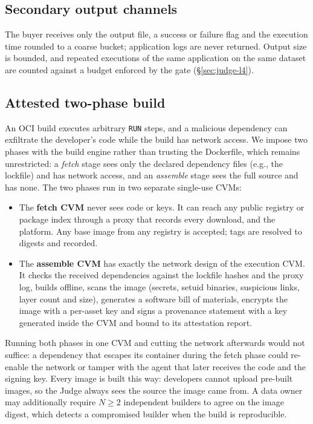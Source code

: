 \subsection{Secondary output channels}\label{sec:design-channels}
The buyer receives only the output file, a success or failure flag and the execution time
rounded to a coarse bucket; application logs are never returned. Output size is bounded, and
repeated executions of the same application on the same dataset are counted against a budget
enforced by the gate (\S\ref{sec:judge-l4}).

\subsection{Attested two-phase build}\label{sec:design-build}

An OCI build executes arbitrary \texttt{RUN} steps, and a malicious dependency can exfiltrate the
developer's code while the build has network access. We impose two phases with the build engine
rather than trusting the Dockerfile, which remains unrestricted: a \emph{fetch} stage sees only
the declared dependency files (e.g., the lockfile) and has network access, and an
\emph{assemble} stage sees the full source and has none. The two phases run in two separate
single-use CVMs:
\begin{itemize}
  \item The \textbf{fetch CVM} never sees code or keys. It can reach any public registry or
  package index through a proxy that records every download, and the platform. Any base image
  from any registry is accepted; tags are resolved to digests and recorded.
  \item The \textbf{assemble CVM} has exactly the network design of the execution CVM. It checks
  the received dependencies against the lockfile hashes and the proxy log, builds offline,
  scans the image (secrets, setuid binaries, suspicious links, layer count and size), generates a
  software bill of materials, encrypts the image with a per-asset key and signs a provenance
  statement with a key generated inside the CVM and bound to its attestation report.
\end{itemize}
Running both phases in one CVM and cutting the network afterwards would not suffice: a dependency
that escapes its container during the fetch phase could re-enable the network or tamper with the
agent that later receives the code and the signing key. Every image is built this way:
developers cannot upload pre-built images, so the Judge always sees the source the image came
from. A data owner may additionally require $N \geq 2$ independent builders to agree on the image
digest, which detects a compromised builder when the build is reproducible.

